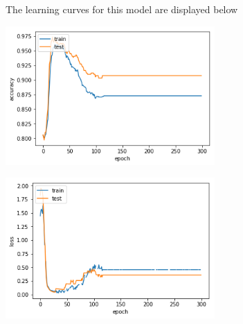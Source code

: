 \documentclass[14pt]{article}
\theoremstyle{plain}
\theoremstyle{definition}
\begin{document}
The learning curves for this model are displayed below
\begin{table}[ht]
\begin{minipage}[b]{0.3\linewidth}
\centering
\includegraphics[width=80mm]{banknote_forgery_files/logmodel_1}
\end{minipage}\hfill
\begin{minipage}[b]{0.5\linewidth}
\centering
\includegraphics[width=80mm]{banknote_forgery_files/logmodel_2}
\end{minipage}
\end{table}
\end{document}
